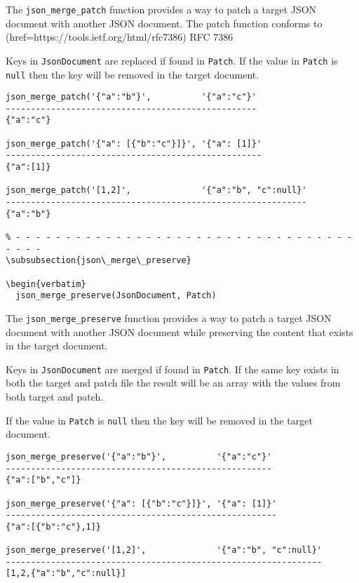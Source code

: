 The \verb`json_merge_patch` function provides a way to patch a target JSON
document with another JSON document.  The patch function conforms to
(href=https://tools.ietf.org/html/rfc7386) RFC 7386

Keys in \verb`JsonDocument` are replaced if found in \verb`Patch`.  If the
value in \verb`Patch` is \verb`null` then the key will be removed in the
target document.

\begin{verbatim}
json_merge_patch('{"a":"b"}',          '{"a":"c"}'
--------------------------------------------------
{"a":"c"}

json_merge_patch('{"a": [{"b":"c"}]}', '{"a": [1]}'
---------------------------------------------------
{"a":[1]}

json_merge_patch('[1,2]',              '{"a":"b", "c":null}'
------------------------------------------------------------
{"a":"b"}

% - - - - - - - - - - - - - - - - - - - - - - - - - - - - - - - - - - - - - -
\subsubsection{json\_merge\_preserve}

\begin{verbatim}
  json_merge_preserve(JsonDocument, Patch)
\end{verbatim}

The \verb`json_merge_preserve` function provides a way to patch a target JSON
document with another JSON document while preserving the content that exists
in the target document.

Keys in \verb`JsonDocument` are merged if found in \verb`Patch`.  If the same
key exists in both the target and patch file the result will be an array with
the values from both target and patch.

If the
value in \verb`Patch` is \verb`null` then the key will be removed in the
target document.

\begin{verbatim}
json_merge_preserve('{"a":"b"}',          '{"a":"c"}'
-----------------------------------------------------
{"a":["b","c"]}

json_merge_preserve('{"a": [{"b":"c"}]}', '{"a": [1]}'
------------------------------------------------------
{"a":[{"b":"c"},1]}

json_merge_preserve('[1,2]',              '{"a":"b", "c":null}'
---------------------------------------------------------------
[1,2,{"a":"b","c":null}]

\end{verbatim}


